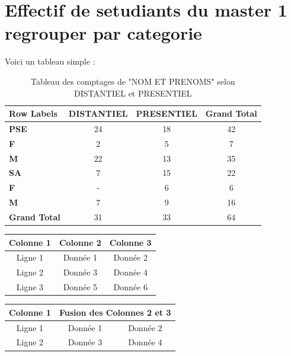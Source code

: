 \documentclass[a4paper,12pt]{article} %
\begin{document}
\section{Effectif de setudiants du master 1 regrouper par categorie}
Voici un tableau simple :

\begin{table}[ht]
\centering
\begin{tabular}{|l|c|c|c|}
\hline
\textbf{Row Labels} & \textbf{DISTANTIEL} & \textbf{PRESENTIEL} & \textbf{Grand Total} \\
\hline
\textbf{PSE}        & 24                 & 18                 & 42                  \\
\hline
\textbf{F}          & 2                  & 5                  & 7                   \\
\hline
\textbf{M}          & 22                 & 13                 & 35                  \\
\hline
\textbf{SA}         & 7                  & 15                 & 22                  \\
\hline
\textbf{F}          & -                  & 6                  & 6                   \\
\hline
\textbf{M}          & 7                  & 9                  & 16                  \\
\hline
\textbf{Grand Total} & 31                 & 33                 & 64                  \\
\hline
\end{tabular}
\caption{Tableau des comptages de "NOM ET PRENOMS" selon DISTANTIEL et PRESENTIEL}
\end{table}


\begin{tabular}{|c|c|c|}
\hline
Colonne 1 & Colonne 2 & Colonne 3 \\ %
\hline
Ligne 1 & Donnée 1 & Donnée 2 \\ %
\hline
Ligne 2 & Donnée 3 & Donnée 4 \\ %
\hline
Ligne 3 & Donnée 5 & Donnée 6 \\ %
\hline
\end{tabular}

\vspace{1cm} %

\begin{tabular}{|c|c|c|}
\hline
Colonne 1 & \multicolumn{2}{c|}{Fusion des Colonnes 2 et 3} \\ %
\hline
Ligne 1 & Donnée 1 & Donnée 2 \\
\hline
Ligne 2 & Donnée 3 & Donnée 4 \\
\hline
\end{tabular}
\end{document}
